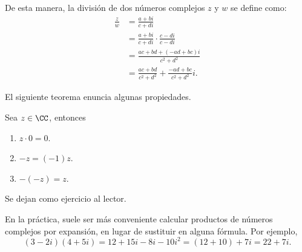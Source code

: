 De esta manera, la división de dos números complejos $z$ y $w$ se define como:
\begin{align*}
    \frac{z}{w} & = \frac{a + b i}{c + d i} \\
    & = \frac{a + b i}{c + d i} \cdot \frac{c - d i}{c - d i} \\
    & = \frac{a c + b d + (-a d + b c) i}{c^2 + d^2} \\
    & = \frac{a c + b d}{c^2 + d^2} + \frac{-a d + b c}{c^2 + d^2} i.
\end{align*}

El siguiente teorema enuncia algunas propiedades.
\begin{theorem}{}{}
    Sea $z \in \CC$, entonces
    \begin{enumerate}[label=\roman*), topsep=6pt, itemsep=0pt]
        \item $z \cdot 0 = 0$.
        \item $-z = (-1)z$.
        \item $-(-z) = z$.
    \end{enumerate}

    \tcblower
    \demostracion Se dejan como ejercicio al lector.
\end{theorem}

\newpage

\begin{examplebox}{}{}
    En la práctica, suele ser más conveniente calcular productos de números complejos por expansión, en lugar de sustituir en alguna fórmula. Por ejemplo,
    $$(3 - 2i)(4 + 5i) = 12 + 15i - 8i - 10i^2 = (12 + 10) + 7i = 22 + 7i.$$
\end{examplebox}

